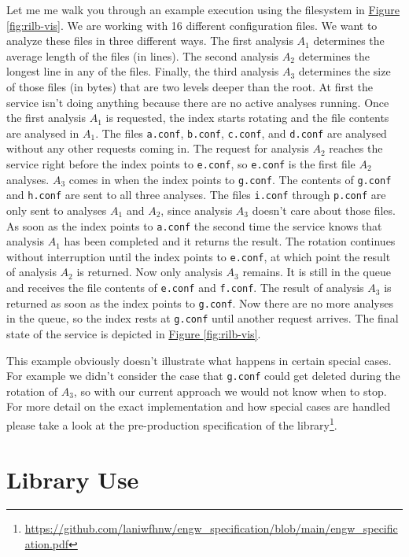 \documentclass[11pt]{article} %
\newcommand{\hidelinks}[1]{{\hypersetup{hidelinks}#1}}
\newcommand{\figref}[1]{\hidelinks{\hyperref[#1]{Figure \ref{#1}}}}
\begin{document}
  Let me me walk you through an example execution using the filesystem in \figref{fig:rilb-vis}. We are working with 16 different configuration files. We want to analyze these files in three different ways. The first analysis $A_1$ determines the average length of the files (in lines). The second analysis $A_2$ determines the longest line in any of the files. Finally, the third analysis $A_3$ determines the size of those files (in bytes) that are two levels deeper than the root. At first the service isn't doing anything because there are no active analyses running. Once the first analysis $A_1$ is requested, the index starts rotating and the file contents are analysed in $A_1$. The files \texttt{a.conf}, \texttt{b.conf}, \texttt{c.conf}, and \texttt{d.conf} are analysed without any other requests coming in. The request for analysis $A_2$ reaches the service right before the index points to \texttt{e.conf}, so \texttt{e.conf} is the first file $A_2$ analyses. $A_3$ comes in when the
  index points to \texttt{g.conf}. The contents of \texttt{g.conf} and \texttt{h.conf} are sent to all three analyses. The files \texttt{i.conf} through \texttt{p.conf} are only sent to analyses $A_1$ and $A_2$, since analysis $A_3$ doesn't care about those files. As soon as the index points to \texttt{a.conf} the second time the service knows that analysis $A_1$ has been completed and it returns the result. The rotation continues without interruption until the index points to \texttt{e.conf}, at which point the result of analysis $A_2$ is returned. Now only analysis $A_3$ remains. It is still in the queue and receives the file contents of \texttt{e.conf} and \texttt{f.conf}. The result of analysis $A_3$ is returned as soon as the index points to \texttt{g.conf}. Now there are no more analyses in the queue, so the index rests at \texttt{g.conf} until another request arrives. The final state of the service is depicted in \figref{fig:rilb-vis}.

  This example obviously doesn't illustrate what happens in certain special cases. For example we didn't consider the case that \texttt{g.conf} could get deleted during the rotation of $A_3$, so with our current approach we would not know when to stop. For more detail on the exact implementation and how special cases are handled please take a look at the pre-production specification of the library\footnote{\url{https://github.com/laniwfhnw/engw_specification/blob/main/engw_specification.pdf}\label{fn:pp-spec}}.



  \section{Library Use}\label{sec:3}
\end{document}
